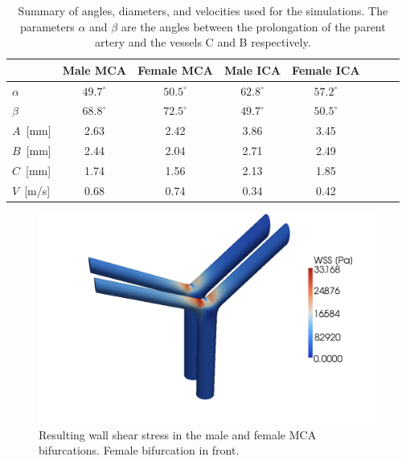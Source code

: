 
\begin{table}
  \center
    \begin{tabular}{l|*{6}{c}r}
      & Male MCA & Female MCA & Male ICA & Female ICA \\
      \hline
      $\alpha$	  & $49.7^\circ$ & $50.5^\circ$   & $62.8^\circ$ & $57.2^\circ$\\
      $\beta$		  & $68.8^\circ$ & $72.5^\circ$   & $49.7^\circ$ & $50.5^\circ$\\
      $A$~[mm]		  & 2.63 & 2.42   & 3.86 & 3.45\\
      $B$~[mm]           & 2.44 & 2.04   & 2.71 & 2.49\\
      $C$~[mm] 	  & 1.74 & 1.56   & 2.13 & 1.85\\
      $V$~[m/s]	  & 0.68   & 0.74     & 0.34   & 0.42  \\
    \end{tabular}
  \caption{Summary of angles, diameters, and velocities used for the
    simulations. The parameters $\alpha$ and $\beta$ are the angles
    between the prolongation of the parent artery and the vessels C
    and B respectively.}
  \label{bcs}
\end{table}

\begin{figure}
  \center\includegraphics[width=\largefig]{chapters/kvs-2/pdf/mcas_wss_II4.pdf}
    \caption{Resulting wall shear stress in the male and female MCA
      bifurcations. Female bifurcation in front.}
    \label{fig:kvs-2:mca_wss_res}
\end{figure}

